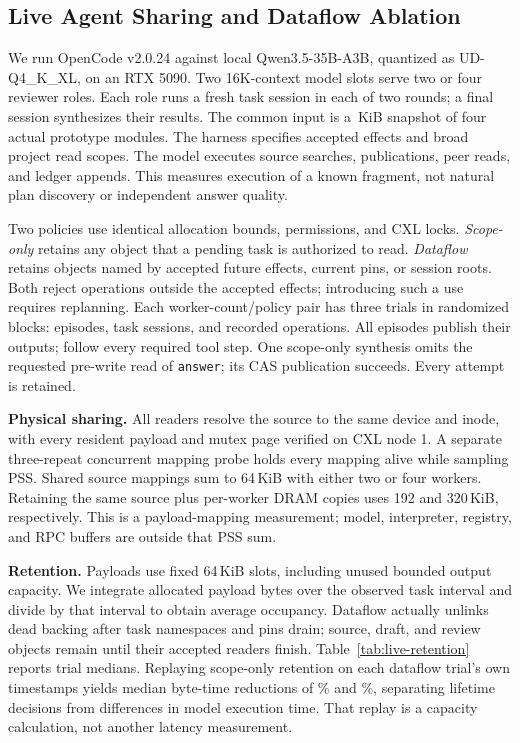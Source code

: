 \subsection{Live Agent Sharing and Dataflow Ablation}
\label{sec:live-profile}

We run OpenCode v2.0.24 against local Qwen3.5-35B-A3B, quantized as
UD-Q4\_K\_XL, on an RTX 5090. Two 16K-context model slots serve two or four
reviewer roles. Each role runs a fresh task session in each of two rounds;
a final session synthesizes their results. The common input is a
\ProfileCorpusKiB\,KiB snapshot of four actual prototype modules.
The harness specifies accepted effects and broad project read scopes.
The model executes source searches, publications, peer reads,
and ledger appends. This measures execution of a known fragment, not natural
plan discovery or independent answer quality.

Two policies use identical allocation bounds, permissions, and CXL locks.
\emph{Scope-only} retains any object that a pending task is authorized to
read. \emph{Dataflow} retains objects named by accepted future effects,
current pins, or session roots. Both reject operations outside the accepted
effects; introducing such a use requires replanning. Each worker-count/policy
pair has three trials in randomized blocks: \ProfileEpisodes{} episodes,
\ProfileSessions{} task sessions, and \ProfileEvents{} recorded operations.
All episodes publish their outputs; \ProfileProtocol{} follow every required
tool step. One scope-only synthesis omits the requested pre-write read of
\texttt{answer}; its CAS publication succeeds. Every attempt is retained.

\textbf{Physical sharing.} All readers resolve the source to the same device
and inode, with every resident payload and mutex page verified on CXL node 1.
A separate three-repeat concurrent mapping probe holds every mapping alive
while sampling PSS. Shared source mappings sum to 64\,KiB with either two or
four workers. Retaining the same source plus per-worker DRAM copies uses
192 and 320\,KiB, respectively. This is a payload-mapping measurement; model,
interpreter, registry, and RPC buffers are outside that PSS sum.

\textbf{Retention.} Payloads use fixed 64\,KiB slots, including unused bounded
output capacity. We integrate allocated payload bytes over the observed task
interval and divide by that interval to obtain average occupancy. Dataflow
actually unlinks dead backing after task namespaces and pins drain; source,
draft, and review objects remain until their accepted readers finish.
Table~\ref{tab:live-retention} reports trial medians. Replaying scope-only
retention on each dataflow trial's own timestamps yields median byte-time
reductions of \ProfileTwoReplaySaving\% and \ProfileFourReplaySaving\%,
separating lifetime decisions from differences in model execution time.
That replay is a capacity calculation, not another latency measurement.

